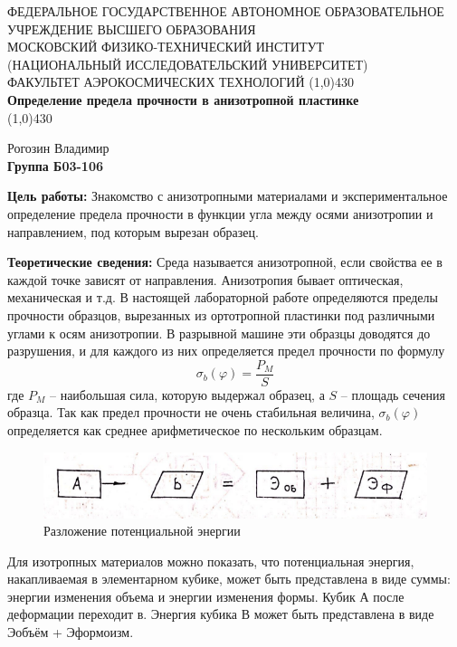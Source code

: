 \documentclass[a4paper,12pt]{article}
\begin{document}
\begin{titlepage}
\begin{center}
\large{\small ФЕДЕРАЛЬНОЕ ГОСУДАРСТВЕННОЕ АВТОНОМНОЕ ОБРАЗОВАТЕЛЬНОЕ\\ УЧРЕЖДЕНИЕ ВЫСШЕГО ОБРАЗОВАНИЯ \\ МОСКОВСКИЙ ФИЗИКО-ТЕХНИЧЕСКИЙ ИНСТИТУТ\\ (НАЦИОНАЛЬНЫЙ ИССЛЕДОВАТЕЛЬСКИЙ УНИВЕРСИТЕТ)\\ ФАКУЛЬТЕТ АЭРОКОСМИЧЕСКИХ ТЕХНОЛОГИЙ}
\vfill
\line(1,0){430}\\[1mm]
\huge\textbf{Определение предела прочности в анизотропной пластинке}\\
\line(1,0){430}\\[1mm]
\vfill
\begin{flushright}
\normalsize{Рогозин Владимир}\\
\normalsize{\textbf{Группа Б03-106}}\\
\end{flushright}
\end{center}
\end{titlepage}

\textbf{Цель работы:} 
Знакомство с анизотропными материалами и экспериментальное определение предела прочности в функции угла между осями анизотропии и направлением, под которым вырезан образец.  

\textbf{Теоретические сведения:} 
Среда называется анизотропной, если свойства ее в каждой точке зависят от направления. Анизотропия бывает оптическая, механическая и т.д. В настоящей лабораторной работе определяются пределы прочности образцов, вырезанных из ортотропной пластинки под различными углами к осям анизотропии. В разрывной машине эти образцы доводятся до разрушения, и для каждого из них определяется предел прочности по формулу
\[\sigma_b (\varphi) = \frac{P_M}{S}\] 
где $P_M$ -- наибольшая сила, которую выдержал образец, а $S$ -- площадь сечения образца. Так как предел прочности не очень стабильная величина, $\sigma_b (\varphi)$ определяется как среднее арифметическое по нескольким образцам.

\begin{figure}[H]\label{fig: Razlozhenie E}
    \centering
    \includegraphics[width=\textwidth]{Разложение энергии.png}
    \caption{Разложение потенциальной энергии}
\end{figure}
Для изотропных материалов можно показать, что потенциальная энергия, накапливаемая в элементарном кубике, может быть представлена в виде суммы: энергии изменения объема и энергии изменения формы. Кубик А после деформации переходит в. Энергия кубика В может быть представлена в виде Эобъём + Эформоизм. 
\end{document}
